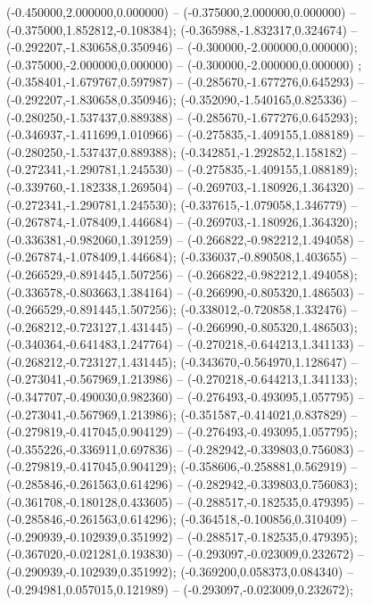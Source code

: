  (-0.450000,2.000000,0.000000) -- (-0.375000,2.000000,0.000000) -- (-0.375000,1.852812,-0.108384);
 (-0.365988,-1.832317,0.324674) -- (-0.292207,-1.830658,0.350946) -- (-0.300000,-2.000000,0.000000);
 (-0.375000,-2.000000,0.000000) -- (-0.300000,-2.000000,0.000000) ;
 (-0.358401,-1.679767,0.597987) -- (-0.285670,-1.677276,0.645293) -- (-0.292207,-1.830658,0.350946);
 (-0.352090,-1.540165,0.825336) -- (-0.280250,-1.537437,0.889388) -- (-0.285670,-1.677276,0.645293);
 (-0.346937,-1.411699,1.010966) -- (-0.275835,-1.409155,1.088189) -- (-0.280250,-1.537437,0.889388);
 (-0.342851,-1.292852,1.158182) -- (-0.272341,-1.290781,1.245530) -- (-0.275835,-1.409155,1.088189);
 (-0.339760,-1.182338,1.269504) -- (-0.269703,-1.180926,1.364320) -- (-0.272341,-1.290781,1.245530);
 (-0.337615,-1.079058,1.346779) -- (-0.267874,-1.078409,1.446684) -- (-0.269703,-1.180926,1.364320);
 (-0.336381,-0.982060,1.391259) -- (-0.266822,-0.982212,1.494058) -- (-0.267874,-1.078409,1.446684);
 (-0.336037,-0.890508,1.403655) -- (-0.266529,-0.891445,1.507256) -- (-0.266822,-0.982212,1.494058);
 (-0.336578,-0.803663,1.384164) -- (-0.266990,-0.805320,1.486503) -- (-0.266529,-0.891445,1.507256);
 (-0.338012,-0.720858,1.332476) -- (-0.268212,-0.723127,1.431445) -- (-0.266990,-0.805320,1.486503);
 (-0.340364,-0.641483,1.247764) -- (-0.270218,-0.644213,1.341133) -- (-0.268212,-0.723127,1.431445);
 (-0.343670,-0.564970,1.128647) -- (-0.273041,-0.567969,1.213986) -- (-0.270218,-0.644213,1.341133);
 (-0.347707,-0.490030,0.982360) -- (-0.276493,-0.493095,1.057795) -- (-0.273041,-0.567969,1.213986);
 (-0.351587,-0.414021,0.837829) -- (-0.279819,-0.417045,0.904129) -- (-0.276493,-0.493095,1.057795);
 (-0.355226,-0.336911,0.697836) -- (-0.282942,-0.339803,0.756083) -- (-0.279819,-0.417045,0.904129);
 (-0.358606,-0.258881,0.562919) -- (-0.285846,-0.261563,0.614296) -- (-0.282942,-0.339803,0.756083);
 (-0.361708,-0.180128,0.433605) -- (-0.288517,-0.182535,0.479395) -- (-0.285846,-0.261563,0.614296);
 (-0.364518,-0.100856,0.310409) -- (-0.290939,-0.102939,0.351992) -- (-0.288517,-0.182535,0.479395);
 (-0.367020,-0.021281,0.193830) -- (-0.293097,-0.023009,0.232672) -- (-0.290939,-0.102939,0.351992);
 (-0.369200,0.058373,0.084340) -- (-0.294981,0.057015,0.121989) -- (-0.293097,-0.023009,0.232672);
